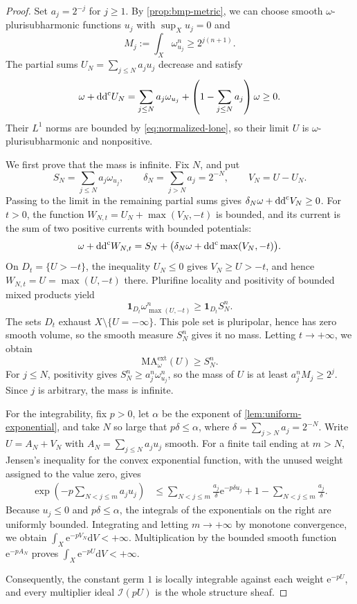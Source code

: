 \begin{proof}
Set $a_j=2^{-j}$ for $j\geq1$. By \cref{prop:bmp-metric}, we can choose smooth $\omega$-plurisubharmonic functions $u_j$ with $\sup_Xu_j=0$ and
\[
 M_j:=\int_X\omega_{u_j}^n\geq2^{j(n+1)}.
\]
The partial sums $U_N=\sum_{j\leq N}a_ju_j$ decrease and satisfy
\[
 \omega+\mathrm{dd}^{\mathrm{c}} U_N
 =\sum_{j\leq N}a_j\omega_{u_j}
     +\left(1-\sum_{j\leq N}a_j\right)\omega\geq0.
\]
Their $L^1$ norms are bounded by \eqref{eq:normalized-lone}, so their limit $U$ is $\omega$-plurisubharmonic and nonpositive.

We first prove that the mass is infinite. Fix $N$, and put
\[
 S_N=\sum_{j\leq N}a_j\omega_{u_j},\qquad
 \delta_N=\sum_{j>N}a_j=2^{-N},\qquad
 V_N=U-U_N.
\]
Passing to the limit in the remaining partial sums gives $\delta_N\omega+\mathrm{dd}^{\mathrm{c}} V_N\geq0$. For $t>0$, the function $W_{N,t}=U_N+\max(V_N,-t)$ is bounded, and its current is the sum of two positive currents with bounded potentials:
\[
 \omega+\mathrm{dd}^{\mathrm{c}} W_{N,t}
 =S_N+\bigl(\delta_N\omega+\mathrm{dd}^{\mathrm{c}}\max(V_N,-t)\bigr).
\]
On $D_t=\{U>-t\}$, the inequality $U_N\leq0$ gives $V_N\geq U>-t$, and hence $W_{N,t}=U=\max(U,-t)$ there. Plurifine locality and positivity of bounded mixed products yield
\[
 \mathbf1_{D_t}\omega_{\max(U,-t)}^n
 \geq\mathbf1_{D_t}S_N^n.
\]
The sets $D_t$ exhaust $X\setminus\{U=-\infty\}$. This pole set is pluripolar, hence has zero smooth volume, so the smooth measure $S_N^n$ gives it no mass. Letting $t\to+\infty$, we obtain
\begin{equation}\label{eq:infinite-mass-partial-sums}
 \mathrm{MA}^{\mathrm{ext}}_\omega(U)\geq S_N^n.
\end{equation}
For $j\leq N$, positivity gives $S_N^n\geq a_j^n\omega_{u_j}^n$, so the mass of $U$ is at least $a_j^nM_j\geq2^j$. Since $j$ is arbitrary, the mass is infinite.

For the integrability, fix $p>0$, let $\alpha$ be the exponent of \cref{lem:uniform-exponential}, and take $N$ so large that
$p\delta\leq\alpha$, where $\delta=\sum_{j>N}a_j=2^{-N}$. Write
$U=A_N+V_N$ with $A_N=\sum_{j\leq N}a_ju_j$ smooth.
For a finite tail ending at $m>N$, Jensen's inequality for the convex exponential function, with the unused weight assigned to the value zero, gives
\begin{align*}
 \exp\!\left(-p\sum_{N<j\leq m}a_ju_j\right)
 &\leq\sum_{N<j\leq m}\frac{a_j}{\delta}
                  \mathrm{e}^{-p\delta u_j}
       +1-\sum_{N<j\leq m}\frac{a_j}{\delta}.
\end{align*}
Because $u_j\leq0$ and $p\delta\leq\alpha$, the integrals of the exponentials on the right are uniformly bounded. Integrating and letting $m\to+\infty$ by monotone convergence, we obtain $\int_X\mathrm{e}^{-pV_N}\mathrm{d}V<+\infty$. Multiplication by the bounded smooth function $\mathrm{e}^{-pA_N}$ proves $\int_X\mathrm{e}^{-pU}\mathrm{d}V<+\infty$.

Consequently, the constant germ $1$ is locally integrable against each weight $\mathrm{e}^{-pU}$, and every multiplier ideal $\mathcal I(pU)$ is the whole structure sheaf.
\end{proof}

